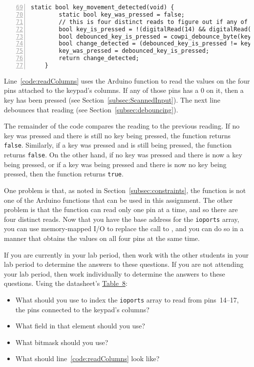 \begin{lstlisting}[numberstyle=\color{gray}, numbers=left, firstnumber=69, escapechar=`]
    static bool key_movement_detected(void) {
        static bool key_was_pressed = false;
        // this is four distinct reads to figure out if any of the column pins has a 0 on it -- can you do it in one read?
        bool key_is_pressed = !(digitalRead(14) && digitalRead(15) && digitalRead(16) && digitalRead(17));  `\label{code:readColumns}`
        bool debounced_key_is_pressed = cowpi_debounce_byte(key_is_pressed, KEYPAD);
        bool change_detected = (debounced_key_is_pressed != key_was_pressed);
        key_was_pressed = debounced_key_is_pressed;
        return change_detected;
    }
\end{lstlisting}

Line~\ref{code:readColumns} uses the Arduino function  to read the values on the four pins attached to the keypad's columns.
If any of those pins has a 0 on it, then a key has been pressed (see Section~\ref{subsec:ScannedInput}).
The next line debounces that reading (see Section~\ref{subsec:debouncing}).

The remainder of the code compares the reading to the previous reading.
If no key was pressed and there is still no key being pressed, the function returns \lstinline{false}.
Similarly, if a key was pressed and is still being pressed, the function returns \lstinline{false}.
On the other hand, if no key was pressed and there is now a key being pressed, or if a key was being pressed and there is now no key being pressed, then the function returns \lstinline{true}.

One problem is that, as noted in Section~\ref{subsec:constraints}, the  function is not one of the Arduino functions that can be used in this assignment.
The other problem is that the  function can read only one pin at a time, and so there are four distinct reads.
Now that you have the base address for the \lstinline{ioports} array, you can use memory-mapped I/O to replace the call to ,
and you can do so in a manner that obtains the values on all four pins at the same time.

If you are currently in your lab period, then work with the other students in your lab period to determine the answers to these questions.
If you are not attending your lab period, then work individually to determine the answers to these questions.
Using the datasheet's \href{https://cow-pi.readthedocs.io/en/latest/microcontroller.html#id9}{Table~8}:
\begin{itemize}
    \item What should you use to index the \lstinline{ioports} array to read from pins~14--17, the pins connected to the keypad's columns?
    \item What field in that element should you use?
    \item What bitmask should you use?
    \item What should line~\ref{code:readColumns} look like?
\end{itemize}


